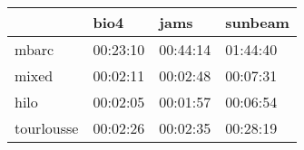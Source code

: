 \begin{tabular}{llll}
\toprule
{} &      bio4 &      jams &   sunbeam \\
\midrule
mbarc      &  00:23:10 &  00:44:14 &  01:44:40 \\
mixed      &  00:02:11 &  00:02:48 &  00:07:31 \\
hilo       &  00:02:05 &  00:01:57 &  00:06:54 \\
tourlousse &  00:02:26 &  00:02:35 &  00:28:19 \\
\bottomrule
\end{tabular}
